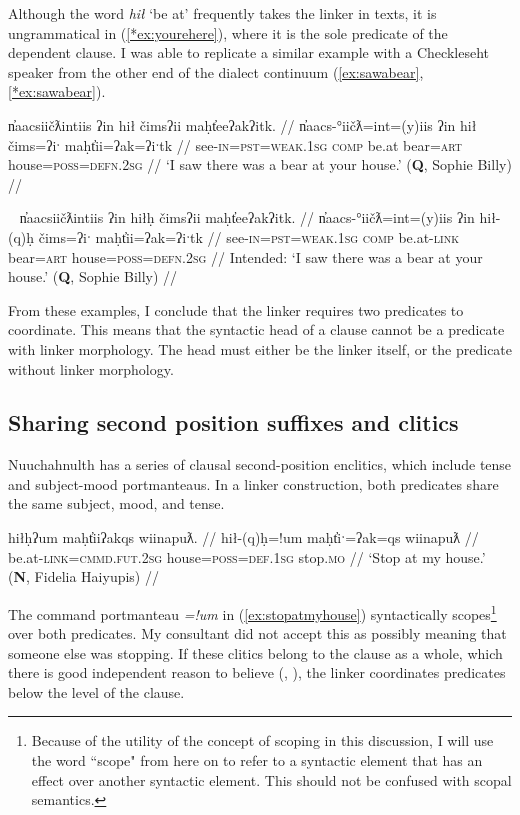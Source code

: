 Although the word \textit{hił} `be at' frequently takes the linker in texts, it is ungrammatical in (\ref{*ex:yourehere}), where it is the sole predicate of the dependent clause. I was able to replicate a similar example with a Checkleseht speaker from the other end of the dialect continuum (\ref{ex:sawabear}, \ref{*ex:sawabear}).

\ex \label{ex:sawabear}
\begingl
\glpreamble n̓aacsiičƛintiis ʔin hił čimsʔii maḥt̓eeʔakʔitk. //
\gla n̓aacs-°iičƛ=int=(y)iis ʔin hił čims=ʔiˑ maḥt̓ii=ʔak=ʔiˑtk //
\glb see-\textsc{in}=\textsc{pst}=\textsc{weak.1sg} \textsc{comp} be.at bear=\textsc{art} house=\textsc{poss}=\textsc{defn.2sg} //
\glft `I saw there was a bear at your house.' (\textbf{Q}, Sophie Billy) //
\endgl
\xe

\ex~ \label{*ex:sawabear}
\begingl
\glpreamble *n̓aacsiičƛintiis ʔin hiłḥ čimsʔii maḥt̓eeʔakʔitk. //
\gla n̓aacs-°iičƛ=int=(y)iis ʔin hił-(q)ḥ čims=ʔiˑ maḥt̓ii=ʔak=ʔiˑtk //
\glb see-\textsc{in}=\textsc{pst}=\textsc{weak.1sg} \textsc{comp} be.at-\textsc{link} bear=\textsc{art} house=\textsc{poss}=\textsc{defn.2sg} //
\glft Intended: `I saw there was a bear at your house.' (\textbf{Q}, Sophie Billy) //
\endgl
\xe

From these examples, I conclude that the linker requires two predicates to coordinate. This means that the syntactic head of a clause cannot be a predicate with linker morphology. The head must either be the linker itself, or the predicate without linker morphology.

\subsection{Sharing second position suffixes and clitics} \label{sec:link:second}

Nuuchahnulth has a series of clausal second-position enclitics, which include tense and subject-mood portmanteaus. In a linker construction, both predicates share the same subject, mood, and tense.

\ex \label{ex:stopatmyhouse}
\begingl
\glpreamble hiłḥʔum maḥt̓iiʔakqs wiinapuƛ. //
\gla hił-(q)ḥ=!um maḥt̓iˑ=ʔak=qs wiinapuƛ //
\glb be.at-\textsc{link}=\textsc{cmmd.fut.2sg} house=\textsc{poss}=\textsc{def.1sg} stop.\textsc{mo} //
\glft `Stop at my house.' (\textbf{N}, Fidelia Haiyupis) //
\endgl
\xe

The command portmanteau \textit{=!um} in (\ref{ex:stopatmyhouse}) syntactically scopes\footnote{Because of the utility of the concept of scoping in this discussion, I will use the word ``scope" from here on to refer to a syntactic element that has an effect over another syntactic element. This should not be confused with scopal semantics.} over both predicates. My consultant did not accept this as possibly meaning that someone else was stopping. If these clitics belong to the clause as a whole, which there is good independent reason to believe (\citealt[35--36]{rose1981}, \citealt[42--50]{woo2007b}), the linker coordinates predicates below the level of the clause.

